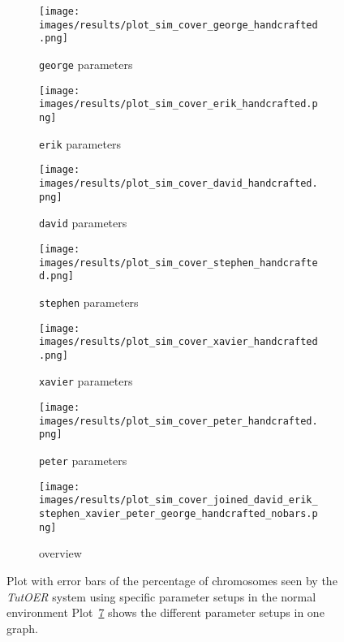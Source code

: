 
\begin{figure}[ht]
	\begin{subfigure}{0.48\linewidth}
	\texttt{[image: images/results/plot\_sim\_cover\_george\_handcrafted.png]}
	\caption{\texttt{george} parameters}
	\label{fig:cover_handcrafted_george}
	\end{subfigure}
	\hfill
	\begin{subfigure}{0.48\linewidth}
	\texttt{[image: images/results/plot\_sim\_cover\_erik\_handcrafted.png]}
	\caption{\texttt{erik} parameters}
	\label{fig:cover_handcrafted_erik}
	\end{subfigure}
	\begin{subfigure}{0.48\linewidth}
	\texttt{[image: images/results/plot\_sim\_cover\_david\_handcrafted.png]}
	\caption{\texttt{david} parameters}
	\label{fig:cover_handcrafted_david}
	\end{subfigure}
	\hfill
	\begin{subfigure}{0.48\linewidth}
	\texttt{[image: images/results/plot\_sim\_cover\_stephen\_handcrafted.png]}
	\caption{\texttt{stephen} parameters}
	\label{fig:cover_handcrafted_stephen}
	\end{subfigure}
	\begin{subfigure}{0.48\linewidth}
	\texttt{[image: images/results/plot\_sim\_cover\_xavier\_handcrafted.png]}
	\caption{\texttt{xavier} parameters}
	\label{fig:cover_handcrafted_xavier}
	\end{subfigure}
	\hfill
	\begin{subfigure}{0.48\linewidth}
	\texttt{[image: images/results/plot\_sim\_cover\_peter\_handcrafted.png]}
	\caption{\texttt{peter} parameters}
	\label{fig:cover_handcrafted_peter}
	\end{subfigure}
	\begin{subfigure}{\linewidth}
	\texttt{[image: images/results/plot\_sim\_cover\_joined\_david\_erik\_stephen\_xavier\_peter\_george\_handcrafted\_nobars.png]}
	\caption{overview}
	\label{fig:cover_handcrafted_overview_group1}
	\end{subfigure}
	\caption[Percentage seen in normal simulated environment for group 1]{Plot with error bars of the percentage of chromosomes seen by the \emph{TutOER}
	system using specific parameter setups in the normal environment
	Plot~\ref{fig:cover_handcrafted_overview_group1} shows the
	different parameter setups in one graph.}
	\label{fig:cover_handcrafted_container_group1}
\end{figure}


